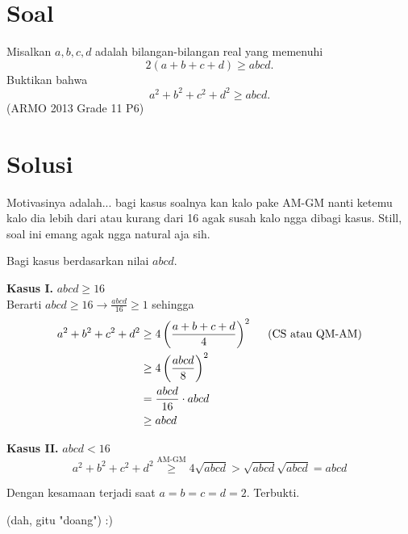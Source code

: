 \section{Soal}
Misalkan $a, b, c, d$ adalah bilangan-bilangan real yang memenuhi
\[
2(a + b + c + d) \ge abcd.
\]
Buktikan bahwa
\[
a^2 + b^2 + c^2 + d^2 \ge abcd.
\]
(ARMO 2013 Grade 11 P6)

\newpage
\section{Solusi}
\begin{remark*}
    Motivasinya adalah... bagi kasus soalnya kan kalo pake AM-GM nanti ketemu kalo dia lebih dari atau kurang dari 16 agak susah kalo ngga dibagi kasus. Still, soal ini emang agak ngga natural aja sih.
\end{remark*}



Bagi kasus berdasarkan nilai $abcd$.

\textbf{Kasus I.} $abcd \ge 16$\\
Berarti $abcd \ge 16 \rightarrow \frac{abcd}{16} \ge 1$ sehingga
\begin{align*}
a^2+b^2+c^2+d^2 &\ge 4\left(\frac{a+b+c+d}{4}\right)^2 \hspace{0.5cm}\text{(CS atau QM-AM)}\\
&\ge 4\left(\frac{abcd}{8}\right)^2 \\
&= \frac{abcd}{16} \cdot abcd\\
&\ge abcd
\end{align*}


\textbf{Kasus II.} $abcd < 16$
\[ a^2+b^2+c^2+d^2 \stackrel{\text{AM-GM}}{\ge} 4\sqrt{abcd} > \sqrt{abcd}\sqrt{abcd} = abcd \]

Dengan kesamaan terjadi saat $a=b=c=d=2$. Terbukti.


\tiny (dah, gitu "doang") :)